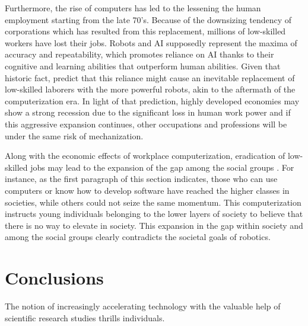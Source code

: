 \documentclass[man]{apa6}
\begin{document}
Furthermore, the rise of computers has led to the lessening the human employment starting from the late 70's.
Because of the downsizing tendency of corporations which has resulted from this replacement, millions of low-skilled workers have lost their jobs.
Robots and AI supposedly represent the maxima of accuracy and repeatability, which promotes reliance on AI thanks to their cognitive and learning abilities that outperform human abilities.
Given that historic fact,  predict that this reliance might cause an inevitable replacement of low-skilled laborers with the more powerful robots, akin to the aftermath of the computerization era.
In light of that prediction, highly developed economies may show a strong recession due to the significant loss in human work power and if this aggressive expansion continues, other occupations and professions will be under the same risk of mechanization. \par

Along with the economic effects of workplace computerization, eradication of low-skilled jobs may lead to the expansion of the gap among the social groups \cite{gre}.
For instance, as the first paragraph of this section indicates, those who can use computers or know how to develop software have reached the higher classes in societies, while others could not seize the same momentum.
This computerization instructs young individuals belonging to the lower layers of society to believe that there is no way to elevate in society.
This expansion in the gap within society and among the social groups clearly contradicts the societal goals of robotics.

\section{Conclusions}
The notion of increasingly accelerating technology with the valuable help of scientific research studies thrills individuals.
\end{document}
